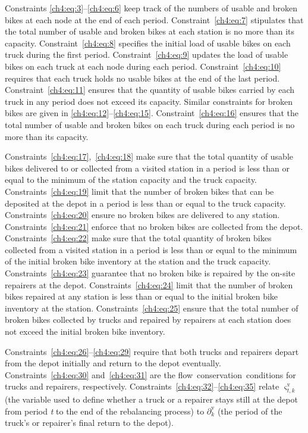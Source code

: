 Constraints \eqref{ch4:eq:3}--\eqref{ch4:eq:6} keep track of the numbers of
usable and broken bikes at each node at the end of each period.
Constraint~\eqref{ch4:eq:7} stipulates that the total number of usable and
broken bikes at each station is no more than its capacity.
Constraint~\eqref{ch4:eq:8} specifies the initial load of usable bikes on each
truck during the first period. Constraint~\eqref{ch4:eq:9} updates the load of
usable bikes on each truck at each node during each period.
Constraint~\eqref{ch4:eq:10} requires that each truck holds no usable bikes at
the end of the last period. Constraint~\eqref{ch4:eq:11} ensures that the
quantity of usable bikes carried by each truck in any period does not exceed its
capacity. Similar constraints for broken bikes are given in
\eqref{ch4:eq:12}--\eqref{ch4:eq:15}. Constraint~\eqref{ch4:eq:16} ensures that
the total number of usable and broken bikes on each truck during each period is
no more than its capacity.

Constraints~\eqref{ch4:eq:17},~\eqref{ch4:eq:18} make sure that the total quantity of usable bikes delivered to or collected
from a visited station in a period is less than or equal to the minimum of the station capacity and
the truck capacity. Constraints~\eqref{ch4:eq:19} limit that the number of broken bikes that can be deposited at
the depot in a period is less than or equal to the truck capacity. Constraints~\eqref{ch4:eq:20} ensure no broken
bikes are delivered to any station. Constraints~\eqref{ch4:eq:21} enforce that no broken bikes are collected from
the depot. Constraints~\eqref{ch4:eq:22} make sure that the total quantity of broken bikes collected from a
visited station in a period is less than or equal to the minimum of the initial broken bike
inventory at the station and the truck capacity. Constraints~\eqref{ch4:eq:23} guarantee that no broken bike is
repaired by the on-site repairers at the depot. Constraints~\eqref{ch4:eq:24} limit that the number of broken
bikes repaired at any station is less than or equal to the initial broken bike inventory at the
station. Constraints~\eqref{ch4:eq:25} ensure that the total number of broken bikes collected by trucks and
repaired by repairers at each station does not exceed the initial broken bike inventory.

Constraints~\eqref{ch4:eq:26}--\eqref{ch4:eq:29} require that both trucks and repairers depart from the depot
initially and return to the depot eventually. Constraints~\eqref{ch4:eq:30} and~\eqref{ch4:eq:31} are the
flow~conservation~conditions for trucks and repairers, respectively. Constraints~\eqref{ch4:eq:32}--\eqref{ch4:eq:35}
relate \(\varsigma_{t,k}^{\text{v}}\)(the variable used to define whether a truck or a repairer stays
still at the depot from period \emph{t} to the end of the rebalancing process) to
\(\partial_{k}^{\text{v}}\) (the period of the truck's or repairer's final return to the depot).

